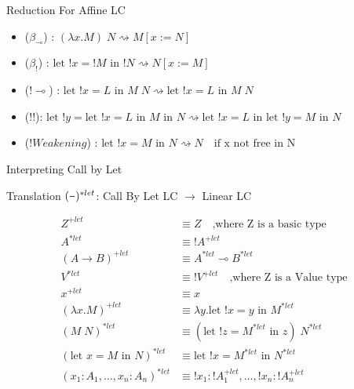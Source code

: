 \documentclass[10pt]{beamer}
\newcommand{\lam}[2]{\lambda #1 . #2}
\newcommand{\llet}[3]{\text{let }  ! #1 = #2 \text{ in } #3}
\newcommand{\plet}[3]{\text{let }   #1 = #2 \text{ in } #3}
\newcommand{\app}[2]{#1 \; #2}
\newcommand{\subst}[2]{[#1 := #2]}
\newcommand{\minus}{\scalebox{0.75}[1.0]{$-$}}
\begin{document}
\begin{frame}{Reduction For Affine LC}
  \begin{itemize}
    \item ($\beta_{\multimap}$) : $\app{(\lam{x}{M})}{N} \rightsquigarrow M \subst{x}{N}$
    \item ($\beta_{!}$) : $\llet{x}{! M}{! N} \rightsquigarrow N \subst{x}{M}$
    \item ($! \multimap$) : $\app{\llet{x}{L}{M}}{N}  \rightsquigarrow \llet{x}{L}{\app{M}{N}}$
    \item ($! !$): $\llet{y}{\llet{x}{L}{M}}{N} \rightsquigarrow \llet{x}{L}{\llet{y}{M}{N}}$
    \item ($! Weakening$) : $\llet{x}{M}{N} \rightsquigarrow N \quad \text{if x not free in N}$
  \end{itemize}
\end{frame}

\begin{frame}[fragile]{Interpreting Call by Let}
  \begin{alertblock}{Translation}
    $(\minus)^{*let}$: Call By Let LC $\to$ Linear LC\\
  \end{alertblock}

  \begin{align*}
    Z^{+let}                             & \equiv Z \quad \text{,where Z is a basic type}           \\
    A^{*let}                             & \equiv ! A^{+let}                                        \\
    (A \rightarrow B)^{+let}             & \equiv A^{*let} \multimap B^{*let}                       \\
    V^{*let}                             & \equiv ! V^{+let} \quad \text{,where Z is a Value type}  \\
    x^{+let}                             & \equiv x                                                 \\
    (\lam{x}{M})^{+let}                  & \equiv \lam{y}{\llet{x}{y}{M^{*let}}}                    \\
    (\app{M}{N})^{*let}                  & \equiv \app{(\llet{z}{M^{*let}}{z})}{N^{*let}}           \\
    (\plet{x}{M}{N})^{*let}              & \equiv \llet{x}{M^{*let}}{N^{*let}}                      \\
    (x_1 : A_1, \dots, x_n : A_n)^{*let} & \equiv ! x_1 : ! A_1^{+let}, \dots, ! x_n : ! A_n^{+let} \\
  \end{align*}
\end{frame}
\end{document}
